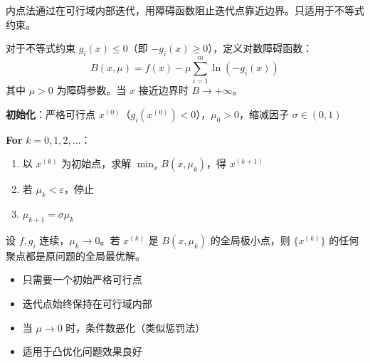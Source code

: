 \begin{conceptbox}[内点法思想]
内点法通过在可行域内部迭代，用障碍函数阻止迭代点靠近边界。只适用于不等式约束。
\end{conceptbox}

\begin{definition}[对数障碍函数]
对于不等式约束 $g_i(x) \leq 0$（即 $-g_i(x) \geq 0$），定义对数障碍函数：
\[
B(x, \mu) = f(x) - \mu \sum_{i=1}^m \ln(-g_i(x))
\]
其中 $\mu > 0$ 为障碍参数。当 $x$ 接近边界时 $B \to +\infty$。
\end{definition}

\begin{algobox}[对数障碍法]
\textbf{初始化}：严格可行点 $x^{(0)}$（$g_i(x^{(0)}) < 0$），$\mu_0 > 0$，缩减因子 $\sigma \in (0,1)$

\textbf{For} $k = 0, 1, 2, \ldots$：
\begin{enumerate}
    \item 以 $x^{(k)}$ 为初始点，求解 $\min_x B(x, \mu_k)$，得 $x^{(k+1)}$
    \item 若 $\mu_k < \varepsilon$，停止
    \item $\mu_{k+1} = \sigma \mu_k$
\end{enumerate}
\end{algobox}

\begin{theorem}[收敛性]
设 $f, g_i$ 连续，$\mu_k \to 0$。若 $x^{(k)}$ 是 $B(x, \mu_k)$ 的全局极小点，则 $\{x^{(k)}\}$ 的任何聚点都是原问题的全局最优解。
\end{theorem}

\begin{notebox}[障碍函数法的特点]
\begin{itemize}
    \item 只需要一个初始严格可行点
    \item 迭代点始终保持在可行域内部
    \item 当 $\mu \to 0$ 时，条件数恶化（类似惩罚法）
    \item 适用于凸优化问题效果良好
\end{itemize}
\end{notebox}


